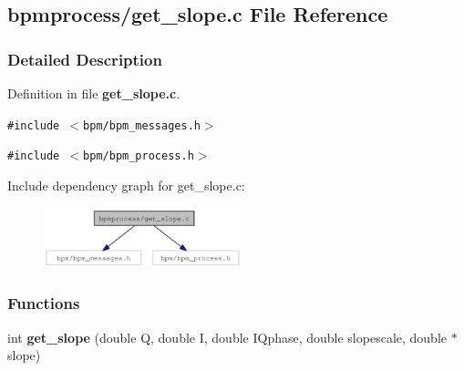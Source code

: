\subsection{bpmprocess/get\_\-slope.c File Reference}
\label{get__slope_8c}


\subsubsection{Detailed Description}


Definition in file {\bf get\_\-slope.c}.

{\tt \#include $<$bpm/bpm\_\-messages.h$>$}\par
{\tt \#include $<$bpm/bpm\_\-process.h$>$}\par


Include dependency graph for get\_\-slope.c:\nopagebreak
\begin{figure}[H]
\begin{center}
\leavevmode
\includegraphics[width=162pt]{get__slope_8c__incl}
\end{center}
\end{figure}
\subsubsection*{Functions}
\begin{CompactItemize}
\item 
int {\bf get\_\-slope} (double Q, double I, double IQphase, double slopescale, double $\ast$slope)
\end{CompactItemize}
